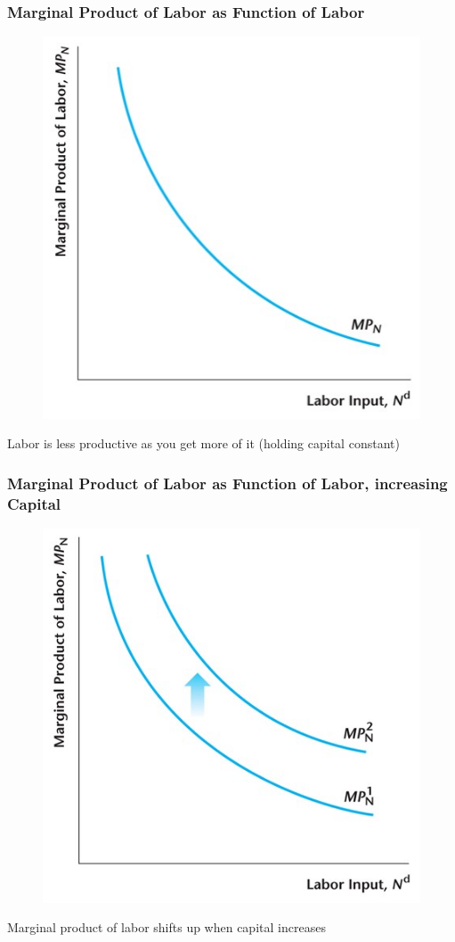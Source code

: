 \documentclass{beamer}
\begin{document}
\begin{frame}
\frametitle[alignment=center]{Marginal Product of Labor as Function of Labor}
\begin{figure}
\centering
\includegraphics[scale=0.5]{Figures/W_Fig_4pt14.png}
\end{figure}
Labor is less productive as you get more of it (holding capital constant)
\end{frame}

\begin{frame}
\frametitle[alignment=center]{Marginal Product of Labor as Function of Labor, increasing Capital}
\begin{figure}
\centering
\includegraphics[scale=0.5]{Figures/W_Fig_4pt15.png}
\end{figure}
Marginal product of labor shifts up when capital increases
\end{frame}
\end{document}
